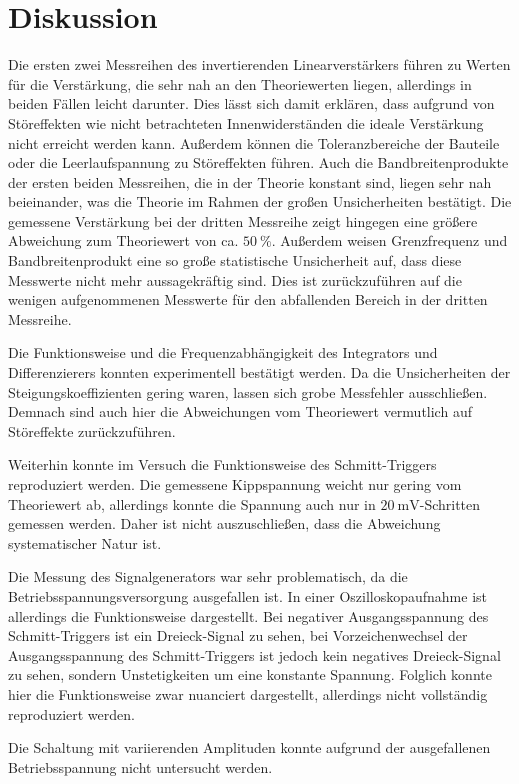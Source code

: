 \section{Diskussion}
Die ersten zwei Messreihen des invertierenden Linearverstärkers führen zu Werten für die Verstärkung, die sehr nah an den Theoriewerten liegen, allerdings in beiden Fällen leicht darunter. Dies lässt sich damit erklären, dass aufgrund von Störeffekten wie nicht betrachteten Innenwiderständen die ideale Verstärkung nicht erreicht werden kann. Außerdem können die Toleranzbereiche der Bauteile oder die Leerlaufspannung zu Störeffekten führen. Auch die Bandbreitenprodukte der ersten beiden Messreihen, die in der Theorie konstant sind, liegen sehr nah beieinander, was die Theorie im Rahmen der großen Unsicherheiten bestätigt. Die gemessene Verstärkung bei der dritten Messreihe zeigt hingegen eine größere Abweichung zum Theoriewert von ca. $\SI{50}{\percent}$. Außerdem weisen Grenzfrequenz und Bandbreitenprodukt eine so große statistische Unsicherheit auf, dass diese Messwerte nicht mehr aussagekräftig sind. Dies ist zurückzuführen auf die wenigen aufgenommenen Messwerte für den abfallenden Bereich in der dritten Messreihe.

Die Funktionsweise und die Frequenzabhängigkeit des Integrators und Differenzierers konnten experimentell bestätigt werden. Da die Unsicherheiten der Steigungskoeffizienten gering waren, lassen sich grobe Messfehler ausschließen. Demnach sind auch hier die Abweichungen vom Theoriewert vermutlich auf Störeffekte zurückzuführen.

Weiterhin konnte im Versuch die Funktionsweise des Schmitt-Triggers reproduziert werden. Die gemessene Kippspannung weicht nur gering vom Theoriewert ab, allerdings konnte die Spannung auch nur in $\SI{20}{\milli\volt}$-Schritten gemessen werden. Daher ist nicht auszuschließen, dass die Abweichung systematischer Natur ist.

Die Messung des Signalgenerators war sehr problematisch, da die Betriebsspannungsversorgung ausgefallen ist. In einer Oszilloskopaufnahme ist allerdings die Funktionsweise dargestellt. Bei negativer Ausgangsspannung des Schmitt-Triggers ist ein Dreieck-Signal zu sehen, bei Vorzeichenwechsel der Ausgangsspannung des Schmitt-Triggers ist jedoch kein negatives Dreieck-Signal zu sehen, sondern Unstetigkeiten um eine konstante Spannung. Folglich konnte hier die Funktionsweise zwar nuanciert dargestellt, allerdings nicht vollständig reproduziert werden.

Die Schaltung mit variierenden Amplituden konnte aufgrund der ausgefallenen Betriebsspannung nicht untersucht werden.
